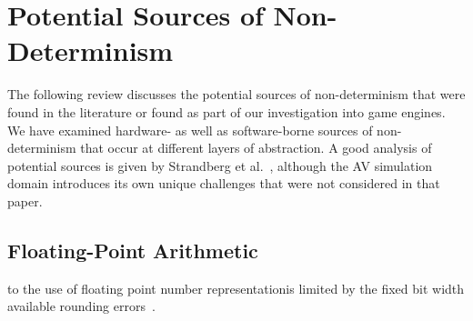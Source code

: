 \section{Potential Sources of Non-Determinism} \label{s:nondeterminisimSources}

The following review discusses the potential sources of non-determinism that were found in the literature or found as part of our investigation into game engines. We have examined hardware- as well as software-borne sources of non-determinism that occur at different layers of abstraction. 
%
A good analysis of potential sources is given by Strandberg et al.~\cite{intermittently-failing-tests}, although the AV simulation domain introduces its own unique challenges that were not considered in that paper.

\medskip


\subsection{Floating-Point Arithmetic}


\DIFdelbegin {}\DIFdelend %
\DIFaddbegin {}\DIFaddend to \DIFaddbegin {}\DIFaddend the use of floating point number representation\DIFdelbegin {}\DIFdelend \DIFaddbegin {}\DIFaddend is limited by the fixed bit width available \DIFdelbegin {}\DIFdelend \DIFaddbegin {}\DIFaddend rounding errors~\cite{FloatingPointsBook,goldberg1991every}. %
\DIFdelbegin %

